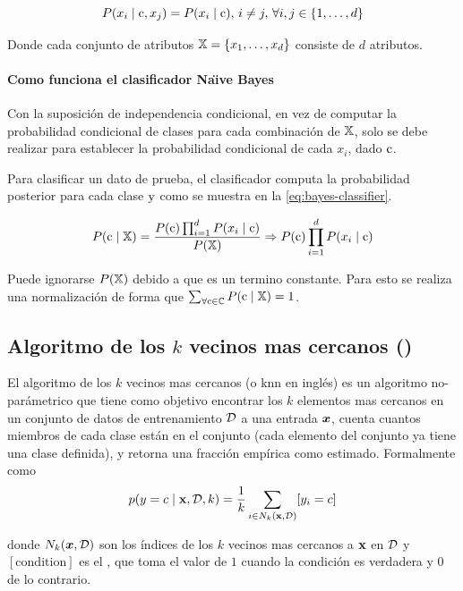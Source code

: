 \begin{equation} \label{eq:bayes-conditional-independence}
  P(x_i \mid {\textnormal{c}}, x_j) = P(x_i \mid {\textnormal{c}}), \, i \neq j, \, \forall i, j \in \{1, \ldots, d\}
\end{equation}

Donde cada conjunto de atributos ${\mathbb{X}}=\{ x_1, \ldots, x_d \}$ consiste de $d$ atributos.
\paragraph{Como funciona el clasificador Na\"{\i}ve Bayes}
Con la suposición de independencia condicional, en vez de computar la probabilidad condicional de clases para cada combinación de ${\mathbb{X}}$, solo se debe realizar para establecer la probabilidad condicional de cada $x_i$, dado ${\textnormal{c}}$.

Para clasificar un dato de prueba, el clasificador computa la probabilidad posterior para cada clase ${\textnormal{y}}$ como se muestra en la \cref{eq:bayes-classifier}.

\begin{equation} \label{eq:bayes-classifier}
  P({\textnormal{c}}\mid {\mathbb{X}}) = \frac{P({\textnormal{c}}) \prod_{i=1}^{d}P(x_i\mid{\textnormal{c}})}{P({\mathbb{X}})} \Rightarrow P({\textnormal{c}}) \prod_{i=1}^{d}P(x_i\mid{\textnormal{c}})
\end{equation}

Puede ignorarse $P({\mathbb{X}})$ debido a que es un termino constante. Para esto se realiza una normalización de forma que $\sum_{\forall {\textnormal{c}} \in {\mathbb{C}}} P({\textnormal{c}}\mid {\mathbb{X}}) = 1$.


\subsection{Algoritmo de los $k$ vecinos mas cercanos ()}
El algoritmo de los $k$ vecinos mas cercanos (o \gls{knn} en inglés) es un algoritmo no-parámetrico que tiene como objetivo encontrar los $k$ elementos mas cercanos en un conjunto de datos de entrenamiento $\mathcal{D}$ a una entrada ${\bm{x}}$, cuenta cuantos miembros de cada clase están en el conjunto (cada elemento del conjunto ya tiene una clase definida), y retorna una fracción empírica como estimado. Formalmente como
\begin{equation} \label{eq:prob-knn}
  p(y = c \mid {\mathbf{x}}, \mathcal{D}, k) = \frac{1}{k} \sum_{i \in N_k({\mathbf{x}}, \mathcal{D})} [y_i = c]
\end{equation}

donde $N_k({\bm{x}}, \mathcal{D})$ son los índices de los $k$ vecinos mas cercanos a ${\mathbf{x}}$ en $\mathcal{D}$ y $[\mathrm{condition}]$ es el , que toma el valor de $1$ cuando la condición es verdadera y $0$ de lo contrario.

